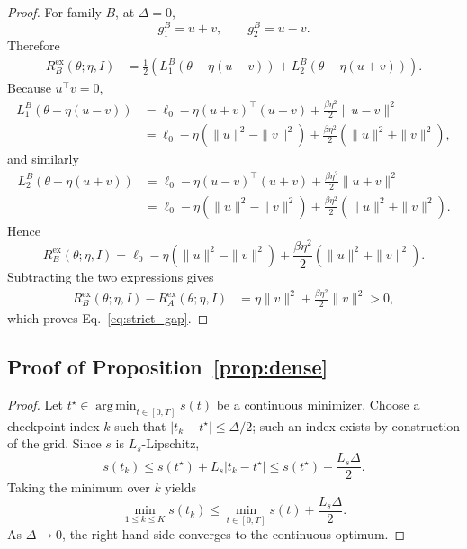 \documentclass{article}
\newcommand{\argmin}{\operatorname*{arg\,min}}
\begin{document}
\begin{proof}
For family $B$, at $\Delta=0$,
\begin{equation}
    g_1^B = u+v,\qquad g_2^B = u-v.
\end{equation}
Therefore
\begin{align}
    R_B^{\mathrm{ex}}(\theta;\eta,I)
    &=
    \frac{1}{2}\left(
        L_1^B(\theta - \eta(u-v)) + L_2^B(\theta - \eta(u+v))
    \right).
\end{align}
Because $u^\top v = 0$,
\begin{align}
    L_1^B(\theta - \eta(u-v))
    &=
    \ell_0 - \eta (u+v)^\top (u-v) + \frac{\beta\eta^2}{2}\|u-v\|^2 \\
    &=
    \ell_0 - \eta(\|u\|^2 - \|v\|^2) + \frac{\beta\eta^2}{2}(\|u\|^2+\|v\|^2),
\end{align}
and similarly
\begin{align}
    L_2^B(\theta - \eta(u+v))
    &=
    \ell_0 - \eta (u-v)^\top (u+v) + \frac{\beta\eta^2}{2}\|u+v\|^2 \\
    &=
    \ell_0 - \eta(\|u\|^2 - \|v\|^2) + \frac{\beta\eta^2}{2}(\|u\|^2+\|v\|^2).
\end{align}
Hence
\begin{equation}
    R_B^{\mathrm{ex}}(\theta;\eta,I)
    =
    \ell_0 - \eta(\|u\|^2 - \|v\|^2) + \frac{\beta\eta^2}{2}(\|u\|^2+\|v\|^2).
\end{equation}
Subtracting the two expressions gives
\begin{align}
    R_B^{\mathrm{ex}}(\theta;\eta,I) - R_A^{\mathrm{ex}}(\theta;\eta,I)
    &=
    \eta \|v\|^2 + \frac{\beta\eta^2}{2}\|v\|^2 > 0,
\end{align}
which proves Eq.~\eqref{eq:strict_gap}.
\end{proof}

\subsection{Proof of Proposition~\ref{prop:dense}}

\begin{proof}
Let $t^\star \in \argmin_{t\in[0,T]} s(t)$ be a continuous minimizer. Choose a checkpoint index $k$ such that $|t_k - t^\star| \le \Delta/2$; such an index exists by construction of the grid. Since $s$ is $L_s$-Lipschitz,
\begin{equation}
    s(t_k) \le s(t^\star) + L_s |t_k - t^\star| \le s(t^\star) + \frac{L_s \Delta}{2}.
\end{equation}
Taking the minimum over $k$ yields
\begin{equation}
    \min_{1\le k\le K} s(t_k) \le \min_{t\in[0,T]} s(t) + \frac{L_s \Delta}{2}.
\end{equation}
As $\Delta \to 0$, the right-hand side converges to the continuous optimum.
\end{proof}
\end{document}
